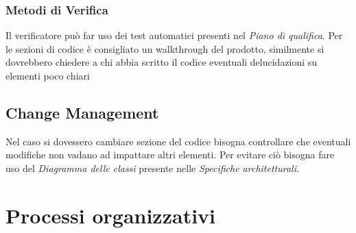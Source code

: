 \documentclass[a4paper, 12pt]{article}
\begin{document}
\subsubsection{Metodi di Verifica}
Il verificatore può far uso dei test automatici presenti nel \textit{Piano di qualifica}.
Per le sezioni di codice è consigliato un walkthrough del prodotto, similmente si dovrebbero chiedere a chi abbia scritto il codice eventuali delucidazioni su elementi poco chiari
\subsection{Change Management}
Nel caso si dovessero cambiare sezione del codice bisogna controllare che eventuali modifiche non vadano ad impattare altri elementi. Per evitare ciò bisogna fare uso del \textit{Diagramma delle classi} presente nelle \textit{Specifiche architetturali}.
\section{Processi organizzativi}
\end{document}
